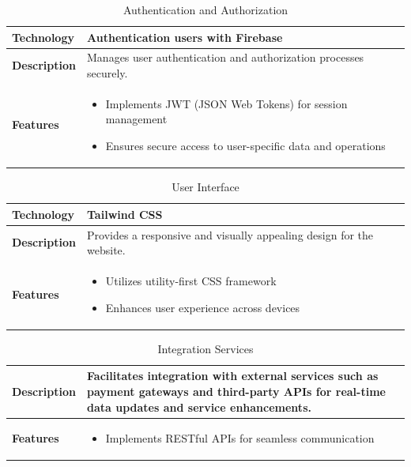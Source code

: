 \documentclass{scrreprt}
\begin{document}
    \begin{table}[ht]
    \centering
    \caption{Authentication and Authorization}
    \begin{tabular}{|p{4cm}|p{10cm}|}
    \hline
    \textbf{Technology} & Authentication users with Firebase \\
    \hline
    \textbf{Description} & Manages user authentication and authorization processes securely. \\
    \hline
    \textbf{Features} &
    \begin{itemize}[label=$\bullet$]
      \item Implements JWT (JSON Web Tokens) for session management
      \item Ensures secure access to user-specific data and operations
    \end{itemize} \\
    \hline
    \end{tabular}
    \end{table}
    
    \vspace{0.5cm}
    
    \begin{table}[ht]
    \centering
    \caption{User Interface}
    \begin{tabular}{|p{4cm}|p{10cm}|}
    \hline
    \textbf{Technology} & Tailwind CSS \\
    \hline
    \textbf{Description} & Provides a responsive and visually appealing design for the website. \\
    \hline
    \textbf{Features} &
    \begin{itemize}[label=$\bullet$]
      \item Utilizes utility-first CSS framework
      \item Enhances user experience across devices
    \end{itemize} \\
    \hline
    \end{tabular}
    \end{table}
    
    \vspace{0.5cm}
    
    \begin{table}[ht]
    \centering
    \caption{Integration Services}
    \begin{tabular}{|p{4cm}|p{10cm}|}
    \hline
    \textbf{Description} & Facilitates integration with external services such as payment gateways and third-party APIs for real-time data updates and service enhancements. \\
    \hline
    \textbf{Features} &
    \begin{itemize}[label=$\bullet$]
      \item Implements RESTful APIs for seamless communication
    \end{itemize} \\
    \hline
    \end{tabular}
    \end{table}
    
\end{document}
